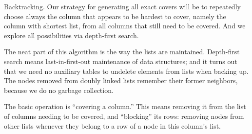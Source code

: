 Backtracking.
Our strategy for generating all exact covers will be to repeatedly
choose always the column that appears to be hardest to cover, namely the
column with shortest list, from all columns that still need to be covered.
And we explore all possibilities via depth-first search.

The neat part of this algorithm is the way the lists are maintained.
Depth-first search means last-in-first-out maintenance of data structures;
and it turns out that we need no auxiliary tables to undelete elements from
lists when backing up. The nodes removed from doubly linked lists remember
their former neighbors, because we do no garbage collection.

The basic operation is ``covering a column.'' This means removing it
from the list of columns needing to be covered, and ``blocking'' its
rows: removing nodes from other lists whenever they belong to a row of
a node in this column's list.

